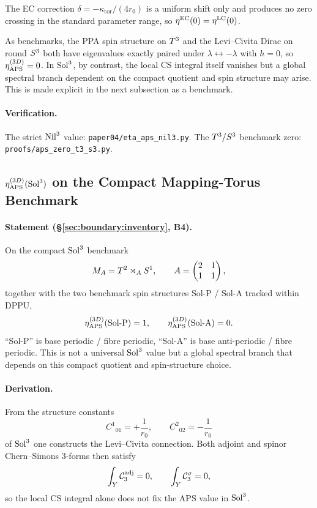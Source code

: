 The EC correction $\delta = -\kappa_{\mathrm{tor}}/(4 r_0)$ is a uniform
shift only and produces no zero crossing in the standard parameter range,
so $\eta^{\mathrm{EC}}(0) = \eta^{\mathrm{LC}}(0)$.

As benchmarks, the PPA spin structure on $T^3$ and the Levi--Civita
Dirac on round $S^3$ both have eigenvalues exactly paired under
$\lambda\leftrightarrow -\lambda$ with $h = 0$, so $\eta_{\mathrm{APS}}^{(3D)} = 0$.  In
$\mathrm{Sol}^3$, by contrast, the local CS integral itself vanishes but a
global spectral branch dependent on the compact quotient and spin structure
may arise.  This is made explicit in the next subsection as a benchmark.

\paragraph{Verification.}
The strict $\mathrm{Nil}^3$ value: \texttt{paper04/eta\_aps\_nil3.py}.
The $T^3 / S^3$ benchmark zero:
\texttt{proofs/aps\_zero\_t3\_s3.py}.

\subsection{$\eta_{\mathrm{APS}}^{(3D)}(\mathrm{Sol}^3)$ on the Compact Mapping-Torus Benchmark}
\label{app:E:E10b}

\paragraph{Statement (\S\ref{sec:boundary:inventory}, B4).}
On the compact $\mathrm{Sol}^3$ benchmark
\begin{equation}
  M_A = T^2\rtimes_A S^1, \qquad
  A = \begin{pmatrix}2 & 1 \\ 1 & 1\end{pmatrix},
\end{equation}
together with the two benchmark spin structures Sol-P / Sol-A tracked
within DPPU,
\begin{equation}
  \eta_{\mathrm{APS}}^{(3D)}(\text{Sol-P}) = 1, \qquad
  \eta_{\mathrm{APS}}^{(3D)}(\text{Sol-A}) = 0.
\end{equation}
``Sol-P'' is base periodic / fibre periodic, ``Sol-A'' is base anti-periodic
/ fibre periodic.  This is not a universal $\mathrm{Sol}^3$ value but a global
spectral branch that depends on this compact quotient and spin-structure
choice.

\paragraph{Derivation.}
From the structure constants
\begin{equation}
  C^1{}_{01} = +\frac{1}{r_0}, \qquad
  C^2{}_{02} = -\frac{1}{r_0}
\end{equation}
of $\mathrm{Sol}^3$ one constructs the Levi--Civita connection.  Both adjoint and
spinor Chern--Simons 3-forms then satisfy
\begin{equation}
  \int_Y\mathcal{C}_3^{\mathrm{adj}} = 0, \qquad \int_Y\mathcal{C}_3^{\sigma} = 0,
\end{equation}
so the local CS integral alone does not fix the APS value in $\mathrm{Sol}^3$.

